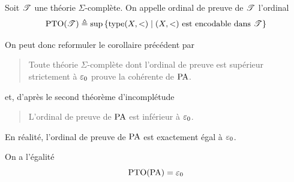 \begin{definition}
  Soit $\mathscr T$ une théorie $\Sigma$-complète. On appelle ordinal de preuve de
  $\mathscr T$ l'ordinal
  \[\operatorname{PTO}(\mathscr T) \triangleq \sup
  \left\{ \operatorname{type}(X,<) \;\middle\vert\; (X,<)\text{ est encodable dans } \mathscr T \right\}\]
  \index[notation]{$\PTO(\varT)$}
\end{definition}

On peut donc reformuler le corollaire précédent par
\begin{quotation}
  \noindent
  Toute théorie $\Sigma$-complète dont l'ordinal de preuve est supérieur
  strictement à $\varepsilon_{0}$ prouve la cohérente de $\operatorname{PA}$.
\end{quotation}
et, d'après le second théorème d'incomplétude
\begin{quotation}
  \noindent
  L'ordinal de preuve de $\operatorname{PA}$ est inférieur à $\varepsilon_{0}$.
\end{quotation}

En réalité, l'ordinal de preuve de $\operatorname{PA}$ est exactement égal à $\varepsilon_{0}$.

\begin{theorem}
  On a l'égalité \[\operatorname{PTO}(\operatorname{PA}) = \varepsilon_{0}\]
\end{theorem}

